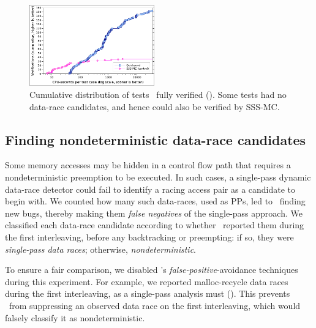 \begin{figure}[t]
	\includegraphics[width=0.48\textwidth]{totalverifs-squashed.pdf}
	\caption{Cumulative distribution of tests \quicksand~fully verified (\sect{\ref{sec:totalverif}}).
	Some tests had no data-race candidates, and hence could also be verified by SSS-MC.}
	\label{fig:totalverif}
\end{figure}


\subsection{Finding nondeterministic data-race candidates}
\label{sec:eval-falseneg}

Some memory accesses may be hidden in a control flow path that requires a nondeterministic preemption to be executed.
In such cases, a single-pass dynamic data-race detector
could fail
to identify a racing access pair as a candidate to begin with.
%
We counted how many such data-races, used as PPs, led to \quicksand~finding new bugs,
thereby making them {\em false negatives} of the single-pass approach.
We classified each data-race candidate according to whether \landslide~reported them during the first interleaving,
before any backtracking or preempting:
if so, they were {\em single-pass data races}; otherwise, {\em nondeterministic}.

To ensure a fair comparison, we disabled \landslide's {\em false-positive}-avoidance techniques during this experiment.
For example, we reported malloc-recycle data races during the first interleaving, as a single-pass analysis must
(\sect{\ref{sec:recycle}}).
This prevents \landslide~from suppressing an observed data race on the first interleaving,
which would falsely classify it as nondeterministic.

